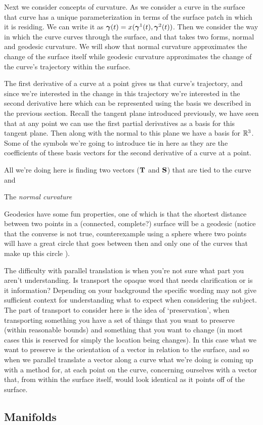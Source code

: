 Next we consider concepts of curvature. As we consider a curve in the surface that curve has a unique parameterization in terms of the surface patch in which it is residing. We can write it as $\boldsymbol{\gamma}(t) = x(\boldsymbol{\gamma}^1(t), \boldsymbol{\gamma}^2(t))$. Then we consider the way in which the curve curves through the surface, and that takes two forms, normal and geodesic curvature. We will show that normal curvature approximates the change of the surface itself while geodesic curvature approximates the change of the curve's trajectory within the surface. 

The first derivative of a curve at a point gives us that curve's trajectory, and since we're interested in the change in this trajectory we're interested in the second derivative here which can be represented using the basis we described in the previous section. Recall the tangent plane introduced previously, we have seen that at any point we can use the first partial derivatives as a basis for this tangent plane. Then along with the normal to this plane we have a basis for $\mathbb{R}^3$. Some of the symbols we're going to introduce tie in here as they are the coefficients of these basis vectors for the second derivative of a curve at a point.

All we're doing here is finding two vectors ($\mathbf{T}$ and $\mathbf{S}$) that are tied to the curve and 

\begin{defn} %
  The \emph{normal curvature}

\end{defn}



Geodesics have some fun properties, one of which is that the shortest distance between two points in a (connected, complete?) surface will be a geodesic (notice that the converse is not true, counterexample using a sphere where two points will have a great circle that goes between then and only one of the curves that make up this circle ).

The difficulty with parallel translation is when you're not sure what part you aren't understanding. Is transport the opaque word that needs clarification or is it information? Depending on your background the specific wording may not give sufficient context for understanding what to expect when considering the subject. The part of transport to consider here is the idea of `preservation', when transporting something you have a set of things that you want to preserve (within reasonable bounds) and something that you want to change (in most cases this is reserved for simply the location being changes). In this case what we want to preserve is the orientation of a vector in relation to the surface, and so when we parallel translate a vector along a curve what we're doing is coming up with a method for, at each point on the curve, concerning ourselves with a vector that, from within the surface itself, would look identical as it points off of the surface.





\subsection{Manifolds}